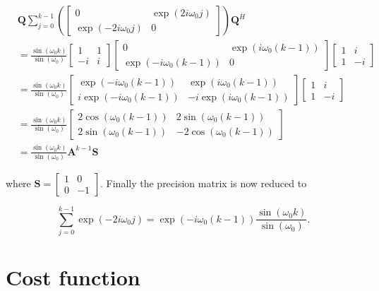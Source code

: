 \documentclass[11pt,a4paper,twoside]{report}
\newcommand{\mat}[1]{\mathbf{#1}}
\begin{document}
\begin{align}
	\nonumber
	& \mat{Q}\sum_{j=0}^{k-1}\left(
		\begin{bmatrix}
			0 & \exp{(2i\omega_0j)} \\
			\exp{(-2i\omega_0j)} & 0
		\end{bmatrix}
		\right)\mat{Q}^H
	\\
	\nonumber
	&= \frac{\sin{\left(\omega_0k\right)}}{\sin{\left(\omega_0\right)}}
		\begin{bmatrix}
			1 & 1\\
			-i & i
		\end{bmatrix}
		\begin{bmatrix}
			0 & \exp{\left(i\omega_0\left(k-1\right)\right)} \\
			\exp{\left(-i\omega_0\left(k-1\right)\right)} & 0
		\end{bmatrix}
		\begin{bmatrix}
			1 & i \\
			1 & -i
		\end{bmatrix}
	\\
	\nonumber
	&= \frac{\sin{\left(\omega_0k\right)}}{\sin{\left(\omega_0\right)}}
		\begin{bmatrix}
			\exp{\left(-i\omega_0\left(k-1\right)\right)} & \exp{\left(i\omega_0\left(k-1\right)\right)} \\
			i\exp{\left(-i\omega_0\left(k-1\right)\right)} & -i\exp{\left(i\omega_0\left(k-1\right)\right)}
		\end{bmatrix}
		\begin{bmatrix}
			1 & i \\
			1 & -i
		\end{bmatrix}
	\\
	\nonumber
	&= \frac{\sin{\left(\omega_0k\right)}}{\sin{\left(\omega_0\right)}}
		\begin{bmatrix}
			2\cos{\left(\omega_0\left(k-1\right)\right)} & 2\sin{\left(\omega_0\left(k-1\right)\right)} \\
			2\sin{\left(\omega_0\left(k-1\right)\right)} & -2\cos{\left(\omega_0\left(k-1\right)\right)}
		\end{bmatrix}
	\\
	&= \frac{\sin{\left(\omega_0k\right)}}{\sin{\left(\omega_0\right)}}\mat{A}^{k-1}\mat{S}
\end{align}

where $\mat{S} = \begin{bmatrix} 1 & 0 \\
0 & -1 \end{bmatrix}$. Finally the precision matrix is now reduced to

\begin{equation*}
	\sum_{j=0}^{k-1}\exp{\left(-2i\omega_0j\right)} = \exp{\left(-i\omega_0\left(k-1\right)\right)}\frac{\sin{\left(\omega_0k\right)}}{\sin{\left(\omega_0\right)}}.
\end{equation*}

\chapter*{Cost function}
\cite{SIP}
\clearpage

%

\end{document}
